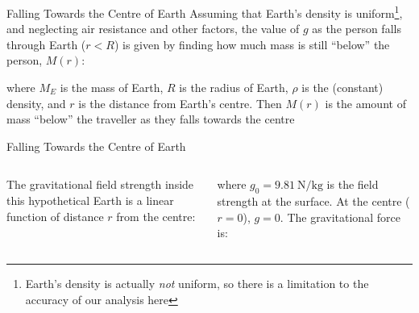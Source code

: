 \documentclass[12pt,compress,aspectratio=169]{beamer}
\begin{document}
\begin{frame}{Falling Towards the Centre of Earth}
  Assuming that Earth's density is uniform\footnote{Earth's density is actually
  \emph{not} uniform, so there is a limitation to the accuracy of our analysis
  here}, and neglecting air resistance and other factors, the value of $g$ as
  the person falls through Earth ($r<R$) is given by finding how much mass is
  still ``below'' the person, $M(r)$:


  where $M_E$ is the mass of Earth, $R$ is the radius of Earth, $\rho$ is the
  (constant) density, and $r$ is the distance from Earth's centre. Then $M(r)$
  is the amount of mass ``below'' the traveller as they falls towards the
  centre
\end{frame}



\begin{frame}{Falling Towards the Centre of Earth}
  \begin{columns}

    The gravitational field strength inside this hypothetical Earth is a
    linear function of distance $r$ from the centre:

    
    where $g_0=\SI{9.81}{\newton\per\kilogram}$ is the field strength at the
    surface. At the centre ($r=0$), $g=0$. The gravitational force is:
    
  \end{columns}
\end{frame}
\end{document}
